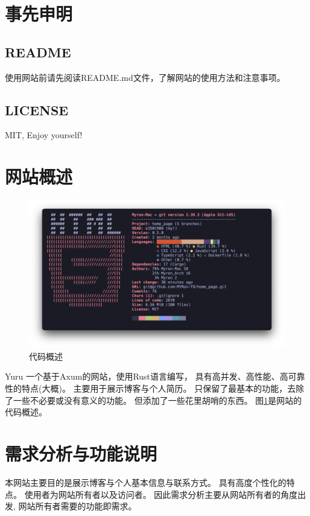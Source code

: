 \documentclass[12pt]{ctexart}
\begin{document}
\tableofcontents
\newpage

\section{事先申明}
\subsection{README}
使用网站前请先阅读README.md文件，了解网站的使用方法和注意事项。
\subsection{LICENSE}
MIT,
Enjoy yourself!

\section{网站概述}

\begin{figure}[!htb]
	\centering
	\includegraphics[width=1\textwidth]{pics/about_the_code.png}
	\caption{代码概述}
	\label{fig:about_the_code}
\end{figure}

Yuru 一个基于Axum的网站，使用Rust语言编写，
具有高并发、高性能、高可靠性的特点(大概)。
主要用于展示博客与个人简历。
只保留了最基本的功能，去除了一些不必要或没有意义的功能。
但添加了一些花里胡哨的东西。
图\ref{fig:about_the_code}是网站的代码概述。


\section{需求分析与功能说明}
本网站主要目的是展示博客与个人基本信息与联系方式。
具有高度个性化的特点。
使用者为网站所有者以及访问者。
因此需求分析主要从网站所有者的角度出发,
网站所有者需要的功能即需求。
\end{document}
